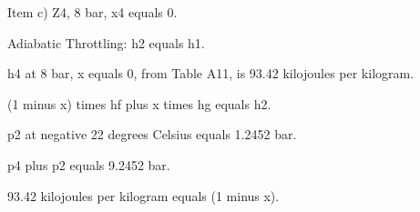 Item c) Z4, 8 bar, x4 equals 0.

Adiabatic Throttling: h2 equals h1.

h4 at 8 bar, x equals 0, from Table A11, is 93.42 kilojoules per kilogram.

(1 minus x) times hf plus x times hg equals h2.

p2 at negative 22 degrees Celsius equals 1.2452 bar.

p4 plus p2 equals 9.2452 bar.

93.42 kilojoules per kilogram equals (1 minus x).
